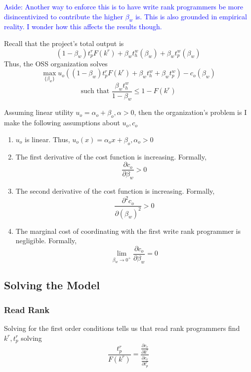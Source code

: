 \documentclass[12pt,notitlepage]{article}
\begin{document}
\textcolor{blue}{Aside: Another way to enforce this is to have write rank programmers be more disincentivized to contribute the higher $\beta_w$ is. This is also grounded in empirical reality. I wonder how this affects the results though. }

Recall that the project's total output is 
$$(1-\beta_w) t_p^r F(k^r) + \beta_w t_h^w(\beta_w) + \beta_w t_p^w(\beta_w)$$
Thus, the OSS organization solves
$$\max_{\{\beta_w\}} u_o\left((1-\beta_w) t_p^r F(k^r) + \beta_w t_h^w + \beta_w t_p^w\right) - c_o(\beta_w)$$ 
$$\text{such that }\frac{\beta_w t_h^w}{1-\beta_w} \leq 1-F(k^r)$$

Assuming linear utility $u_o = \alpha_o + \beta_o, \alpha>0$, then the organization's problem is 
I make the following assumptions about $u_o, c_o$
\begin{enumerate}
    \item $u_o$ is linear. Thus, $u_o(x) = \alpha_ox + \beta_o, \alpha_o > 0$
    \item The first derivative of the cost function is increasing. Formally, 
    $$\frac{\partial c_o}{\partial \beta_w}>0$$
    \item  The second derivative of the cost function is increasing. Formally, $$\frac{\partial^2 c_o}{\partial (\beta_w)^2}>0$$
    \item The marginal cost of coordinating with the first write rank programmer is negligible. Formally,
    $$\lim_{\beta_w \to 0^+} \frac{\partial c_o}{\partial \beta_w} = 0 $$
\end{enumerate}

\subsection{Solving the Model}
\subsubsection{Read Rank}
Solving for the first order conditions tells us that read rank programmers find $k^r, t_p^r$ solving $$\frac{t_p^r}{F(k^r)} = \frac{\frac{\partial c_r}{\partial k^r}}{\frac{\partial c_r}{\partial t_p^r}}$$
\end{document}
